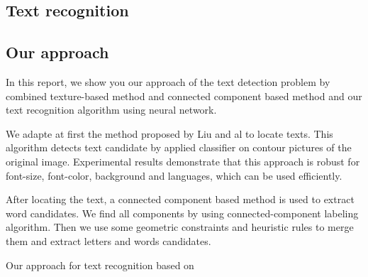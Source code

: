 \documentclass[paper=a4, french, 11pt]{scrartcl}
\begin{document}
\subsection{Text recognition}


\subsection{Our approach}
In this report, we show you our approach of the text detection problem by combined texture-based method and connected component based method and our text recognition algorithm using neural network. 

We adapte at first the method proposed by Liu and al to locate texts. This algorithm detects text candidate by applied classifier on contour pictures of the original image. Experimental results demonstrate that this approach is robust for font-size, font-color, background and languages, which can be used efficiently.

After locating the text, a connected component based method is used to extract word candidates. We find all components by using connected-component labeling algorithm. Then we use some geometric constraints and heuristic rules to merge them and extract letters and words candidates.  

Our approach for text recognition based on 
\end{document}
